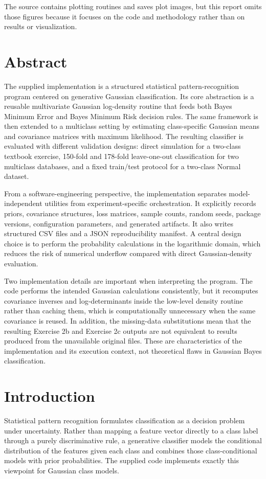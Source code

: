 \documentclass[11pt,a4paper]{article}
\begin{document}
The source contains plotting routines and saves plot images, but this report omits those figures because it focuses on the code and methodology rather than on results or visualization.

\section{Abstract}
The supplied implementation is a structured statistical pattern-recognition program centered on generative Gaussian classification. Its core abstraction is a reusable multivariate Gaussian log-density routine that feeds both Bayes Minimum Error and Bayes Minimum Risk decision rules. The same framework is then extended to a multiclass setting by estimating class-specific Gaussian means and covariance matrices with maximum likelihood. The resulting classifier is evaluated with different validation designs: direct simulation for a two-class textbook exercise, 150-fold and 178-fold leave-one-out classification for two multiclass databases, and a fixed train/test protocol for a two-class Normal dataset.

From a software-engineering perspective, the implementation separates model-independent utilities from experiment-specific orchestration. It explicitly records priors, covariance structures, loss matrices, sample counts, random seeds, package versions, configuration parameters, and generated artifacts. It also writes structured CSV files and a JSON reproducibility manifest. A central design choice is to perform the probability calculations in the logarithmic domain, which reduces the risk of numerical underflow compared with direct Gaussian-density evaluation.

Two implementation details are important when interpreting the program. The code performs the intended Gaussian calculations consistently, but it recomputes covariance inverses and log-determinants inside the low-level density routine rather than caching them, which is computationally unnecessary when the same covariance is reused. In addition, the missing-data substitutions mean that the resulting Exercise 2b and Exercise 2c outputs are not equivalent to results produced from the unavailable original files. These are characteristics of the implementation and its execution context, not theoretical flaws in Gaussian Bayes classification.

\section{Introduction}
Statistical pattern recognition formulates classification as a decision problem under uncertainty. Rather than mapping a feature vector directly to a class label through a purely discriminative rule, a generative classifier models the conditional distribution of the features given each class and combines those class-conditional models with prior probabilities. The supplied code implements exactly this viewpoint for Gaussian class models.
\end{document}
